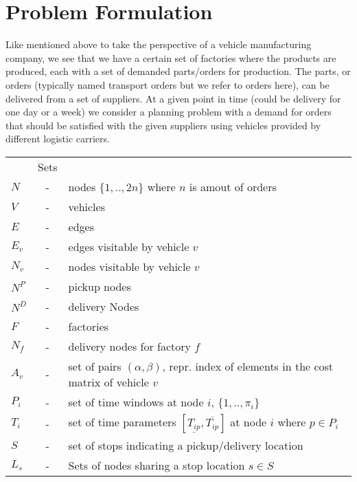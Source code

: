 \documentclass[a4paper,10pt]{article}
\begin{document}
\section{Problem Formulation} \label{sec:PForm}
Like mentioned above to take the perspective of a vehicle manufacturing company, we see that we have a certain set of factories where the products are produced, each with a set of demanded parts/orders for production.
The parts, or orders (typically named transport orders but we refer to orders here), can be delivered from a set of suppliers.
At a given point in time (could be delivery for one day or a week) we consider a planning problem with a demand for orders that should be satisfied with the given suppliers using vehicles provided by different logistic carriers.
\linebreak

\begin{tabular}{l c l }
              &Sets 					        	\\ 
    $N      $ &-& nodes $\{1,..,2n\}$ where $n$ is amout of orders      \\
    $V      $ &-& vehicles  					        \\
    $E      $ &-& edges 					        \\
    $E_v    $ &-& edges visitable by vehicle $v$ 		        \\
    $N_v    $ &-& nodes visitable by vehicle $v$  		        \\
    $N^P    $ &-& pickup nodes 					        \\
    $N^D    $ &-& delivery Nodes 				        \\
    $F      $ &-& factories 					        \\
    $N_f    $ &-& delivery nodes for factory $f$ 		        \\
    $A_v    $ &-& set of pairs $(\alpha, \beta)$, repr. 
                  index of elements in the cost matrix of vehicle $v$   \\
    $P_i    $ &-& set of time windows at node $i$, $\{1,..,\pi_i \}$	\\
    $T_{i}  $ &-& set of time parameters $[ \underline{T_{ip}},  
		  \overline{T_{ip}} ]$ at node $i$ where $p \in P_i$	\\
    $S      $ &-& set of stops indicating a pickup/delivery location    \\
    $L_s    $ &-& Sets of nodes sharing a stop location 
                  $s \in S$ 	                                        \\
\end{tabular}
\linebreak
\linebreak
\par
\end{document}
